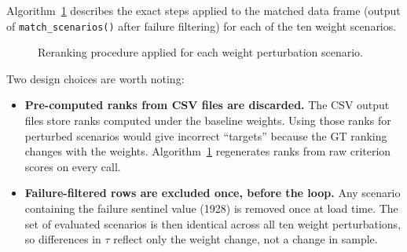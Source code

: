 \documentclass[11pt]{article}
\begin{document}
Algorithm~\ref{alg:rerank} describes the exact steps applied to the matched
data frame (output of \texttt{match\_scenarios()} after failure filtering)
for each of the ten weight scenarios.

\begin{figure}[ht]
\begin{center}
\end{center}
\caption{Reranking procedure applied for each weight perturbation scenario.}
\label{alg:rerank}
\end{figure}

Two design choices are worth noting:
\begin{itemize}
  \item \textbf{Pre-computed ranks from CSV files are discarded.}
        The CSV output files store ranks computed under the baseline weights.
        Using those ranks for perturbed scenarios would give incorrect
        ``targets'' because the GT ranking changes with the weights.
        Algorithm~\ref{alg:rerank} regenerates ranks from raw criterion
        scores on every call.
  \item \textbf{Failure-filtered rows are excluded once, before the loop.}
        Any scenario containing the failure sentinel value (1928) is
        removed once at load time.  The set of evaluated scenarios is then
        identical across all ten weight perturbations, so differences in
        $\tau$ reflect only the weight change, not a change in sample.
\end{itemize}
\end{document}
